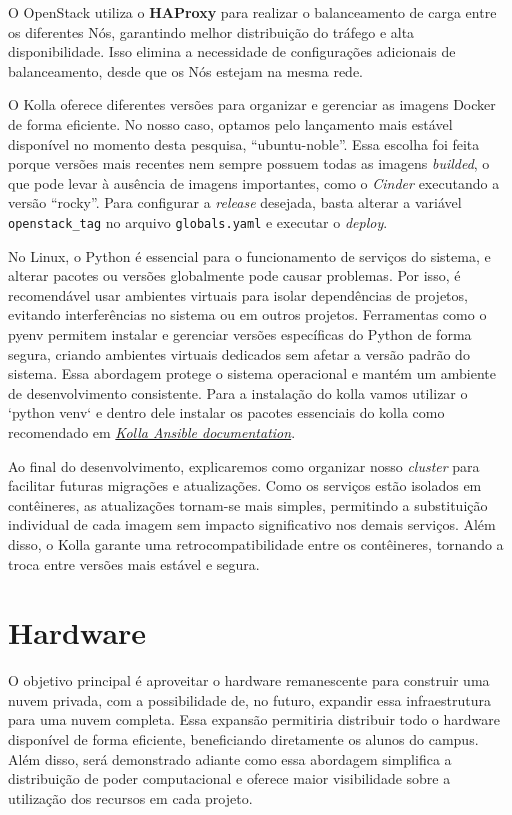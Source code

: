 O OpenStack utiliza o \textbf{HAProxy} para realizar o balanceamento de carga entre os diferentes Nós, garantindo melhor distribuição do tráfego e alta disponibilidade. Isso elimina a necessidade de configurações adicionais de balanceamento, desde que os Nós estejam na mesma rede.

O Kolla oferece diferentes versões para organizar e gerenciar as imagens Docker de forma eficiente. No nosso caso, optamos pelo lançamento mais estável disponível no momento desta pesquisa, ``ubuntu-noble''. Essa escolha foi feita porque versões mais recentes nem sempre possuem todas as imagens \textit{builded}, o que pode levar à ausência de imagens importantes, como o \textit{Cinder} executando a versão ``rocky''. Para configurar a \textit{release} desejada, basta alterar a variável \texttt{openstack\_tag} no arquivo \texttt{globals.yaml} e executar o \textit{deploy}.

No Linux, o Python é essencial para o funcionamento de serviços do sistema, e alterar pacotes ou versões globalmente pode causar problemas. Por isso, é recomendável usar ambientes virtuais para isolar dependências de projetos, evitando interferências no sistema ou em outros projetos. Ferramentas como o pyenv permitem instalar e gerenciar versões específicas do Python de forma segura, criando ambientes virtuais dedicados sem afetar a versão padrão do sistema. Essa abordagem protege o sistema operacional e mantém um ambiente de desenvolvimento consistente. Para a instalação do kolla vamos utilizar o `python venv` e dentro dele instalar os pacotes essenciais do kolla como recomendado em \textit{\href{https://docs.openstack.org/kolla-ansible/latest/user/quickstart.html}{Kolla Ansible documentation}}.

Ao final do desenvolvimento, explicaremos como organizar nosso \textit{cluster} para facilitar futuras migrações e atualizações. Como os serviços estão isolados em contêineres, as atualizações tornam-se mais simples, permitindo a substituição individual de cada imagem sem impacto significativo nos demais serviços. Além disso, o Kolla garante uma retrocompatibilidade entre os contêineres, tornando a troca entre versões mais estável e segura.


\section{Hardware}

O objetivo principal é aproveitar o hardware remanescente para construir uma nuvem privada, com a possibilidade de, no futuro, expandir essa infraestrutura para uma nuvem completa. Essa expansão permitiria distribuir todo o hardware disponível de forma eficiente, beneficiando diretamente os alunos do campus. Além disso, será demonstrado adiante como essa abordagem simplifica a distribuição de poder computacional e oferece maior visibilidade sobre a utilização dos recursos em cada projeto.

